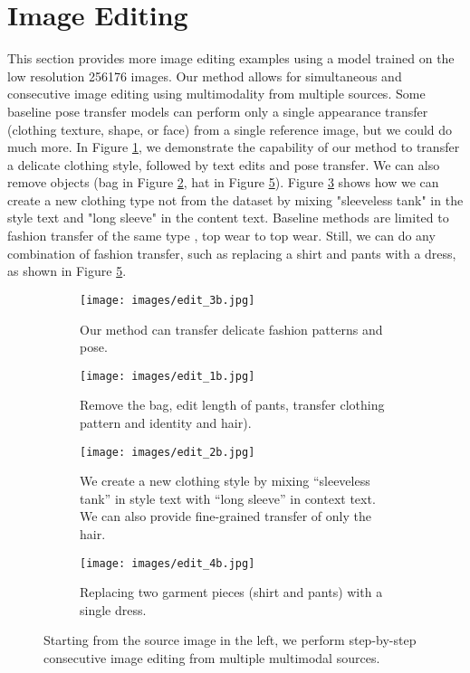 \documentclass[10pt,twocolumn,letterpaper]{article}
\begin{document}
\section{Image Editing}\label{sec:B}
This section provides more image editing examples using a model trained on the low resolution 256176 images. Our method allows for simultaneous and consecutive image editing using multimodality from multiple sources. Some baseline pose transfer models can perform only a single appearance transfer (clothing texture, shape, or face) from a single reference image, but we could do much more. In Figure \ref{fig:appendix.edit3}, we demonstrate the capability of our method to transfer a delicate clothing style, followed by text edits and pose transfer. We can also remove objects (bag in Figure \ref{fig:appendix.edit1}, hat in Figure \ref{fig:appendix.edit4}). Figure \ref{fig:appendix.edit2} shows how we can create a new  clothing type not from the dataset by mixing "sleeveless tank" in the style text and "long sleeve" in the content text.  Baseline methods are limited to fashion transfer of the same type \ie, top wear to top wear. Still, we can do any combination of fashion transfer, such as replacing a shirt and pants with a dress, as shown in Figure \ref{fig:appendix.edit4}.

\begin{figure}[H]
\begin{subfigure}[]{0.5\columnwidth}
        \centering
        \texttt{[image: images/edit\_3b.jpg]}
        \caption{Our method can transfer delicate fashion patterns and pose.}
        \label{fig:appendix.edit3}
        \end{subfigure}    
        \begin{subfigure}[]{0.5\columnwidth}
        \centering
        \texttt{[image: images/edit\_1b.jpg]}
        \caption{Remove the bag, edit length of pants, transfer clothing pattern and identity \face and hair).}
        \label{fig:appendix.edit1}
        \end{subfigure}   
        \begin{subfigure}[]{0.5\columnwidth}
        \centering
        \texttt{[image: images/edit\_2b.jpg]}
        \caption{We create a new clothing style by mixing ``sleeveless tank'' in style text with ``long sleeve'' in context text. We can also provide fine-grained transfer of only the hair.}
        \label{fig:appendix.edit2}
        \end{subfigure}          
        \begin{subfigure}[]{0.5\columnwidth}
        \centering
        \texttt{[image: images/edit\_4b.jpg]}
        \caption{Replacing two garment pieces (shirt and pants) with a single dress.}
        \label{fig:appendix.edit4}
        \end{subfigure}         
                
\vspace{1mm}
\caption{Starting from the source image in the left, we perform step-by-step consecutive image editing from multiple multimodal sources.}
\end{figure}
\newpage
\end{document}
